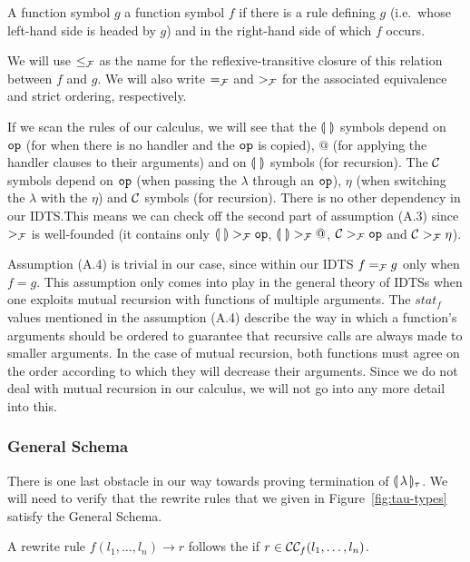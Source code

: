 \begin{definition}
  A function symbol $g$  a function symbol $f$ if there
  is a rule defining $g$ (i.e.\ whose left-hand side is headed by $g$) and
  in the right-hand side of which $f$ occurs.

  We will use $\le_{\mathcal{F}}$ as the name for the reflexive-transitive closure of
  this relation between $f$ and $g$. We will also write $=_{\mathcal{F}}$ and $>_{\mathcal{F}}$
  for the associated equivalence and strict ordering, respectively.
\end{definition}

If we scan the rules of our calculus, we will see that the $\llparenthesis \,  \, \rrparenthesis$
symbols depend on $\mathtt{op}$ (for when there is no handler and the $\mathtt{op}$
is copied), $@$ (for applying the handler clauses to their arguments) and
on $\llparenthesis \,  \, \rrparenthesis$ symbols (for recursion). The $\mathcal{C}$ symbols depend on
$\mathtt{op}$ (when passing the $\lambda$ through an $\mathtt{op}$), $\eta$ (when
switching the $\lambda$ with the $\eta$) and $\mathcal{C}$ symbols (for
recursion). There is no other dependency in our IDTS.\@ This means we can
check off the second part of assumption (A.3) since $>_{\mathcal{F}}$ is well-founded
(it contains only $\llparenthesis \,  \, \rrparenthesis >_{\mathcal{F}} \mathtt{op}$, $\llparenthesis \,  \, \rrparenthesis >_{\mathcal{F}} @$,
$\mathcal{C} >_{\mathcal{F}} \mathtt{op}$ and $\mathcal{C} >_{\mathcal{F}} \eta$).

Assumption (A.4) is trivial in our case, since within our IDTS $f =_{\mathcal{F}} g$
only when $f = g$. This assumption only comes into play in the general
theory of IDTSs when one exploits mutual recursion with functions of
multiple arguments. The $stat_f$ values mentioned in the assumption (A.4)
describe the way in which a function's arguments should be ordered to
guarantee that recursive calls are always made to smaller arguments. In the
case of mutual recursion, both functions must agree on the order according
to which they will decrease their arguments. Since we do not deal with
mutual recursion in our calculus, we will not go into any more detail into
this.


\subsubsection{General Schema}

There is one last obstacle in our way towards proving termination of
$\llparenthesis \, \lambda \, \rrparenthesis_\tau$. We will need to verify that the rewrite rules that
we given in Figure~\ref{fig:tau-types} satisfy the General Schema.

\begin{definition}
  A rewrite rule $f(l_1, \ldots, l_n) \to r$ follows the  if $r \in \mathcal{C}\mathcal{C}_f(l_1, \ldots, l_n)$.
\end{definition}

